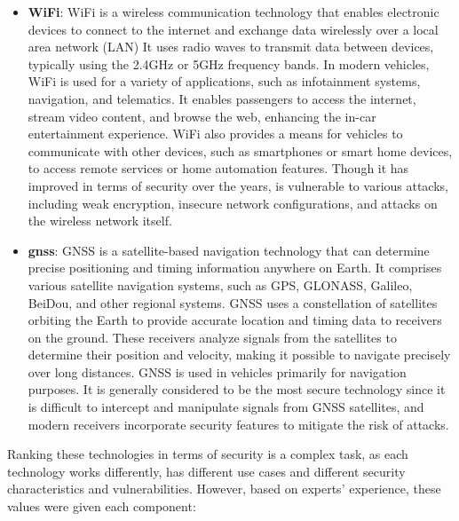 \begin{itemize}
    \item \textbf{WiFi}: WiFi is a wireless communication technology that enables electronic devices to connect to the internet and exchange data wirelessly over a local area network (LAN)
    It uses radio waves to transmit data between devices, typically using the 2.4GHz or 5GHz frequency bands.
    In modern vehicles, WiFi is used for a variety of applications, such as infotainment systems, navigation, and telematics. 
    It enables passengers to access the internet, stream video content, and browse the web, enhancing the in-car entertainment experience. 
    WiFi also provides a means for vehicles to communicate with other devices, such as smartphones or smart home devices, to access remote services or home automation features.
    Though it has improved in terms of security over the years, is vulnerable to various attacks, including weak encryption, insecure network configurations, and attacks on the wireless network itself.

    \item \textbf{\gls{gnss}}: GNSS is a satellite-based navigation technology that can determine precise positioning and timing information anywhere on Earth. 
    It comprises various satellite navigation systems, such as GPS, GLONASS, Galileo, BeiDou, and other regional systems.
    GNSS uses a constellation of satellites orbiting the Earth to provide accurate location and timing data to receivers on the ground. 
    These receivers analyze signals from the satellites to determine their position and velocity, making it possible to navigate precisely over long distances.
    GNSS is used in vehicles primarily for navigation purposes.
    It is generally considered to be the most secure technology since it is difficult to intercept and manipulate signals from GNSS satellites, 
    and modern receivers incorporate security features to mitigate the risk of attacks.
\end{itemize}
    
Ranking these technologies in terms of security is a complex task, as each technology works differently,
has different use cases and different security characteristics and vulnerabilities.
However, based on experts' experience, these values were given each component:

